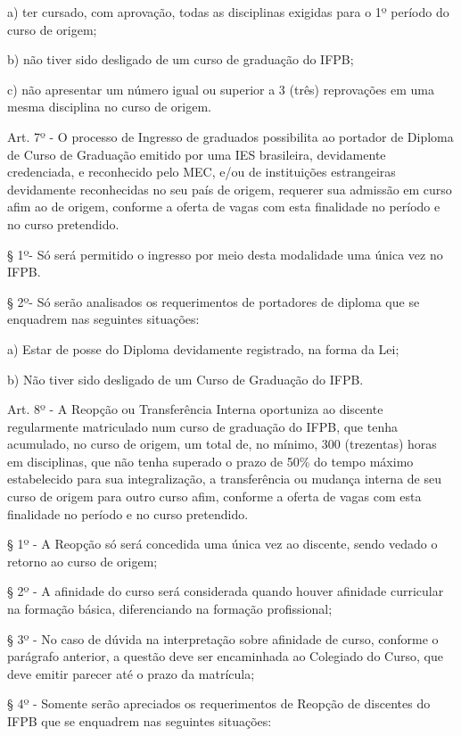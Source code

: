 a)	ter cursado, com aprovação, todas as disciplinas exigidas para o 1º período do curso de origem;

b)	não tiver sido desligado de um curso de graduação do IFPB;

c)	não apresentar um número igual ou superior a 3 (três) reprovações em uma mesma disciplina no curso de origem.

\vspace{1mm}
Art. 7º - O processo de Ingresso de graduados possibilita ao portador de Diploma de Curso de Graduação emitido por uma IES brasileira, devidamente credenciada, e reconhecido pelo MEC, e/ou de instituições estrangeiras devidamente reconhecidas no seu país de origem, requerer sua admissão em curso afim ao de origem, conforme a oferta de vagas com esta finalidade no período e no curso pretendido.

§ 1º- Só será permitido o ingresso por meio desta modalidade uma única vez no IFPB.

§ 2º- Só serão analisados os requerimentos de portadores de diploma que se enquadrem nas seguintes situações:

a) Estar de posse do Diploma devidamente registrado, na forma da Lei;

b) Não tiver sido desligado de um Curso de Graduação do IFPB.

\vspace{1mm}
	Art. 8º - A Reopção ou Transferência Interna oportuniza ao discente regularmente matriculado num curso de graduação do IFPB, que tenha acumulado, no curso de origem, um total de, no mínimo, 300 (trezentas) horas em disciplinas, que não tenha superado o prazo de 50\% do tempo máximo estabelecido para sua integralização, a transferência ou mudança interna de seu curso de origem para outro curso afim, conforme a oferta de vagas com esta finalidade no período e no curso pretendido.

	§ 1º - A Reopção só será concedida uma única vez ao discente, sendo vedado o retorno ao curso de origem;

	§ 2º - A afinidade do curso será considerada quando houver afinidade curricular na formação básica, diferenciando na formação profissional;

	§ 3º - No caso de dúvida na interpretação sobre afinidade de curso, conforme o parágrafo anterior, a questão deve ser encaminhada ao Colegiado do Curso, que deve emitir parecer até o prazo da matrícula;

	§ 4º - Somente serão apreciados os requerimentos de Reopção de discentes do IFPB que se enquadrem nas seguintes situações:

